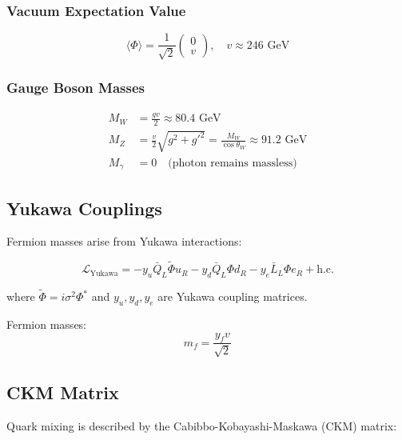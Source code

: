 \subsubsection{Vacuum Expectation Value}

\begin{equation}
\langle \Phi \rangle = \frac{1}{\sqrt{2}}\begin{pmatrix} 0 \\ v \end{pmatrix}, \quad v \approx 246 \text{ GeV}
\end{equation}

\subsubsection{Gauge Boson Masses}

\begin{align}
M_W &= \frac{gv}{2} \approx 80.4 \text{ GeV} \label{eq:canonical:W_mass} \\
M_Z &= \frac{v}{2}\sqrt{g^2 + g'^2} = \frac{M_W}{\cos\theta_W} \approx 91.2 \text{ GeV} \label{eq:canonical:Z_mass} \\
M_\gamma &= 0 \quad \text{(photon remains massless)} \label{eq:canonical:photon_mass}
\end{align}

\subsection{Yukawa Couplings}

Fermion masses arise from Yukawa interactions:

\begin{equation}
\mathcal{L}_{\text{Yukawa}} = -y_u \bar{Q}_L \tilde{\Phi} u_R - y_d \bar{Q}_L \Phi d_R - y_e \bar{L}_L \Phi e_R + \text{h.c.}
\end{equation}

where $\tilde{\Phi} = i\sigma^2\Phi^*$ and $y_u, y_d, y_e$ are Yukawa coupling matrices.

Fermion masses:
\begin{equation}
m_f = \frac{y_f v}{\sqrt{2}}
\end{equation}

\subsection{CKM Matrix}

Quark mixing is described by the Cabibbo-Kobayashi-Maskawa (CKM) matrix:

